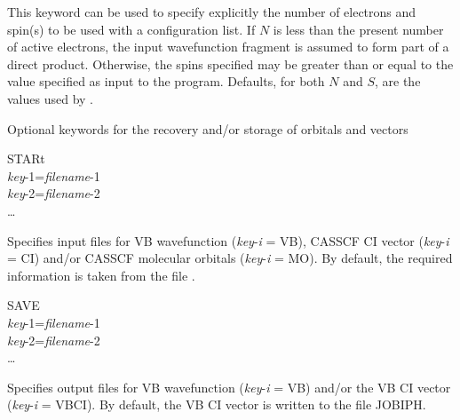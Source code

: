 \begin{keywordlist}
This keyword can be used to specify explicitly the number of electrons and spin(s) to
be used with a configuration list. If $N$ is less than the present number of active electrons,
the input wavefunction fragment is assumed to form part of a direct product. Otherwise, the spins
specified may be greater than or equal to the  value specified as input to the 
program. Defaults, for both $N$ and $S$, are the values used by .
\end{keywordlist}


Optional keywords for the recovery and/or storage of orbitals and vectors
\begin{keywordlist}
\item[STARt]
\\
{\em key}-1={\em filename}-1\\
{\em key}-2={\em filename}-2\\
\ldots\\

Specifies input files for VB wavefunction ({\em key}-{\em i} = VB),
CASSCF CI vector ({\em key}-{\em i} = CI) and/or CASSCF molecular orbitals
({\em key}-{\em i} = MO).
By default, the required information is taken from the file .
\item[SAVE]
\\
{\em key}-1={\em filename}-1\\
{\em key}-2={\em filename}-2\\
\ldots\\

Specifies output files for VB wavefunction ({\em key}-{\em i} = VB)
and/or the VB CI vector ({\em key}-{\em i} = VBCI). By default, the VB CI
vector is written to the file JOBIPH.
\end{keywordlist}


